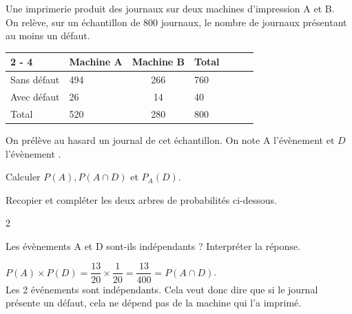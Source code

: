 \documentclass[11pt,a4paper]{article}  %
\begin{document}
Une imprimerie produit des journaux sur deux machines d'impression A et B.\\
On relève, sur un échantillon de 800 journaux, le nombre de journaux présentant au moins un défaut.\\
\begin{tabular}{|l|Xc|Xc|Xc|}
	\cline { 2 - 4 } \multicolumn{1}{Xc|}{} & Machine A & Machine B & Total \\
	\hline Sans défaut & 494 & 266 & 760 \\
	\hline Avec défaut & 26 & 14 & 40 \\
	\hline Total & 520 & 280 & 800 \\
	\hline
\end{tabular}


On prélève au hasard un journal de cet échantillon. On note A l'évènement  et $D$ l'évènement .
\begin{enumMet}
	\item Calculer $P(A), P(A \cap D)$ et $P_A(D)$.\quad {}
	\item Recopier et compléter les deux arbres de probabilités ci-dessous.
	\begin{multicols}{2}
		
	\end{multicols}
	\item Les évènements A et D sont-ils indépendants ? Interpréter la réponse.
	\begin{corrBox}
			$P(A)\times P(D)=\dfrac{13}{20}\times\dfrac{1}{20}=\dfrac{13}{400}=P(A \cap D)$.\\
			Les 2 événements sont indépendants. Cela veut donc dire que si le journal présente un défaut, cela ne dépend pas de la machine qui l'a imprimé.
	\end{corrBox}
\end{enumMet}
\end{document}
